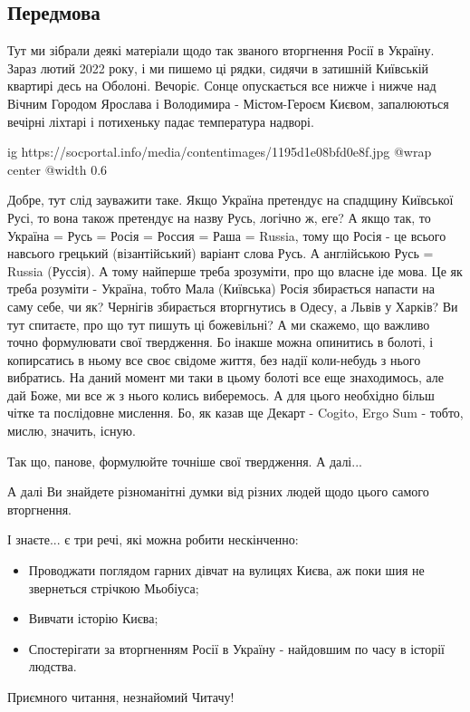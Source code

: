  
 
 
 
 
\subsection{Передмова}

Тут ми зібрали деякі матеріали щодо так званого вторгнення Росії в Україну.
Зараз лютий 2022 року, і ми пишемо ці рядки, сидячи в затишній Київській
квартирі десь на Оболоні. Вечоріє. Сонце опускається все нижче і нижче над
Вічним Городом Ярослава і Володимира - Містом-Героєм Києвом, запалюються
вечірні ліхтарі і потихеньку падає температура надворі.

\ifcmt
  ig https://socportal.info/media/contentimages/1195d1e08bfd0e8f.jpg
	@wrap center
	@width 0.6
\fi

Добре, тут слід зауважити таке. Якщо Україна претендує на спадщину Київської
Русі, то вона також претендує на назву Русь, логічно ж, еге? А якщо так, то
Україна = Русь = Росія = Россия = Раша = Russia, тому що Росія - це всього
навсього грецький (візантійський) варіант слова Русь. А англійською Русь =
Russia (Руссія). А тому найперше треба зрозуміти, про що власне іде мова. Це як
треба розуміти - Україна, тобто Мала (Київська) Росія збирається напасти на
саму себе, чи як?  Чернігів збирається вторгнутись в Одесу, а Львів у Харків?
Ви тут спитаєте, про що тут пишуть ці божевільні?  А ми скажемо, що важливо
точно формулювати свої твердження. Бо інакше можна опинитись в болоті, і
копирсатись в ньому все своє свідоме життя, без надії коли-небудь з нього
вибратись. На даний момент ми таки в цьому болоті все еще знаходимось, але дай
Боже, ми все ж з нього колись виберемось. А для цього необхідно більш чітке та
послідовне мислення. Бо, як казав ще Декарт - Cogito, Ergo Sum - тобто, мислю,
значить, існую.

Так що, панове, формулюйте точніше свої твердження. А далі...

А далі Ви знайдете різноманітні думки від різних людей щодо цього самого
вторгнення.

І знаєте... є три речі, які можна робити нескінченно:

\begin{itemize} %
\item Проводжати поглядом гарних дівчат на вулицях Києва, аж поки шия не звернеться стрічкою Мьобіуса;
\item Вивчати історію Києва;
\item Спостерігати за вторгненням Росії в Україну - найдовшим по часу в історії людства.
\end{itemize} %

Приємного читання, незнайомий Читачу!

